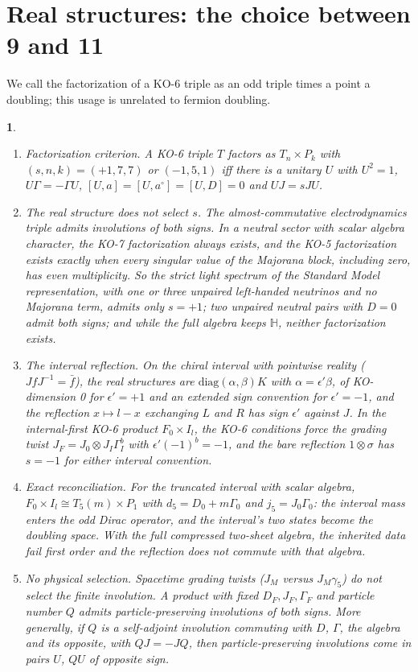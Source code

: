 \documentclass[aps,prd,reprint,onecolumn,nofootinbib,amsmath,amssymb,floatfix]{revtex4-2}
\theoremstyle{plain}
\newcommand{\resultname}{}
\newtheorem*{resultenv}{\resultname}
\newenvironment{result}[1]{\renewcommand{\resultname}{#1}\begin{resultenv}}{\end{resultenv}}
\renewcommand{\H}{\mathbb H}
\begin{document}
\section{Real structures: the choice between 9 and 11}
\label{sec:real}

We call the factorization of a KO-6 triple as an odd triple times a point a doubling; this usage is unrelated to fermion doubling.

\begin{result}{Theorem D}
\begin{enumerate}
\item \emph{Factorization criterion.} A KO-6 triple $T$ factors as $T_n\times P_k$ with $(s,n,k)=(+1,7,7)$ or $(-1,5,1)$ iff there is a unitary $U$ with $U^2=1$, $U\Gamma=-\Gamma U$, $[U,a]=[U,a^\circ]=[U,D]=0$ and $UJ=sJU$.
\item \emph{The real structure does not select $s$.} The almost-commutative electrodynamics triple admits involutions of both signs. In a neutral sector with scalar algebra character, the KO-7 factorization always exists, and the KO-5 factorization exists exactly when every singular value of the Majorana block, including zero, has even multiplicity. So the strict light spectrum of the Standard Model representation, with one or three unpaired left-handed neutrinos and no Majorana term, admits only $s=+1$; two unpaired neutral pairs with $D=0$ admit both signs; and while the full algebra keeps $\H$, neither factorization exists.
\item \emph{The interval reflection.} On the chiral interval with pointwise reality ($JfJ^{-1}=\bar f$), the real structures are $\mathrm{diag}(\alpha,\beta)K$ with $\alpha=\epsilon'\beta$, of KO-dimension 0 for $\epsilon'=+1$ and an extended sign convention for $\epsilon'=-1$, and the reflection $x\mapsto l-x$ exchanging $L$ and $R$ has sign $\epsilon'$ against $J$. In the internal-first KO-6 product $F_0\times I_l$, the KO-6 conditions force the grading twist $J_F=J_0\otimes J_I\Gamma_I^b$ with $\epsilon'(-1)^b=-1$, and the bare reflection $1\otimes\sigma$ has $s=-1$ for either interval convention.
\item \emph{Exact reconciliation.} For the truncated interval with scalar algebra, $F_0\times I_l\cong T_5(m)\times P_1$ with $d_5=D_0+m\Gamma_0$ and $j_5=J_0\Gamma_0$: the interval mass enters the odd Dirac operator, and the interval's two states become the doubling space. With the full compressed two-sheet algebra, the inherited data fail first order and the reflection does not commute with that algebra.
\item \emph{No physical selection.} Spacetime grading twists ($J_M$ versus $J_M\gamma_5$) do not select the finite involution. A product with fixed $D_F,J_F,\Gamma_F$ and particle number $Q$ admits particle-preserving involutions of both signs. More generally, if $Q$ is a self-adjoint involution commuting with $D$, $\Gamma$, the algebra and its opposite, with $QJ=-JQ$, then particle-preserving involutions come in pairs $U$, $QU$ of opposite sign.
\end{enumerate}
\end{result}
\end{document}
